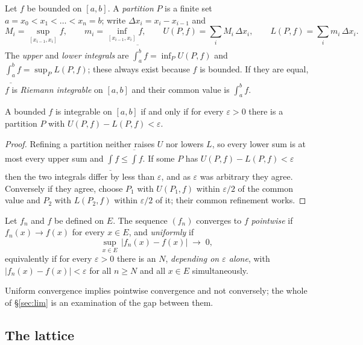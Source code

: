 \begin{definition}\label{def:int}
Let $f$ be bounded on $[a,b]$. A \emph{partition} $P$ is a finite set
$a=x_0<x_1<\dots<x_n=b$; write $\Delta x_i = x_i-x_{i-1}$ and
\[ M_i = \sup_{[x_{i-1},x_i]} f, \qquad m_i = \inf_{[x_{i-1},x_i]} f,
   \qquad U(P,f) = \sum_i M_i\,\Delta x_i, \qquad
   L(P,f) = \sum_i m_i\,\Delta x_i . \]
The \emph{upper} and \emph{lower integrals} are
$\overline{\int_a^b} f = \inf_P U(P,f)$ and
$\underline{\int_a^b} f = \sup_P L(P,f)$; these always exist because $f$ is
bounded. If they are equal, $f$ is \emph{Riemann integrable} on $[a,b]$ and
their common value is $\int_a^b f$.
\end{definition}

\begin{lemma}\label{lem:riemann}
A bounded $f$ is integrable on $[a,b]$ if and only if for every
$\varepsilon>0$ there is a partition $P$ with
$U(P,f)-L(P,f) < \varepsilon$.
\end{lemma}

\begin{proof}
Refining a partition neither raises $U$ nor lowers $L$, so every lower sum is
at most every upper sum and
$\underline{\int} f \le \overline{\int} f$. If some $P$ has
$U(P,f)-L(P,f)<\varepsilon$ then the two integrals differ by less than
$\varepsilon$, and as $\varepsilon$ was arbitrary they agree. Conversely if
they agree, choose $P_1$ with $U(P_1,f)$ within $\varepsilon/2$ of the
common value and $P_2$ with $L(P_2,f)$ within $\varepsilon/2$ of it; their
common refinement works.
\end{proof}

\begin{definition}[Convergence]\label{def:conv}
Let $f_n$ and $f$ be defined on $E$. The sequence $(f_n)$ converges to $f$
\emph{pointwise} if $f_n(x)\to f(x)$ for every $x \in E$, and
\emph{uniformly} if
\[ \sup_{x\in E}\,|f_n(x)-f(x)| \;\longrightarrow\; 0 , \]
equivalently if for every $\varepsilon>0$ there is an $N$, \emph{depending on
$\varepsilon$ alone}, with $|f_n(x)-f(x)|<\varepsilon$ for all $n \ge N$ and
all $x \in E$ simultaneously.
\end{definition}

Uniform convergence implies pointwise convergence and not conversely; the
whole of \S\ref{sec:lim} is an examination of the gap between them.

\subsection*{The lattice}

